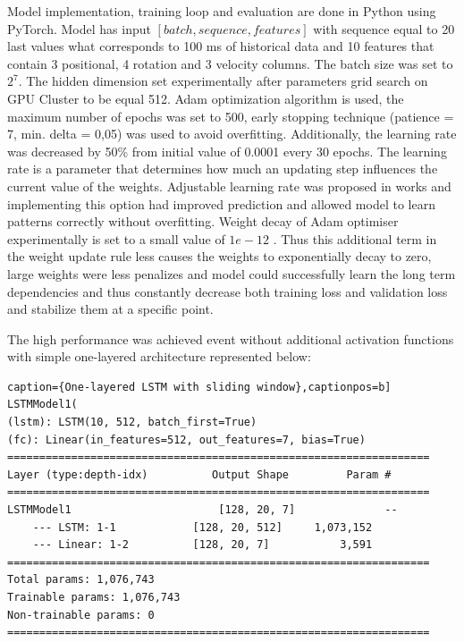 Model implementation, training loop and evaluation are done in Python using PyTorch. Model has input $[batch, sequence, features]$ with sequence equal to 20 last values what corresponds to 100 ms of historical data and 10 features that contain 3 positional, 4 rotation and 3 velocity columns. The batch size was set to $2^{7}$. The hidden dimension set experimentally after parameters grid search on GPU Cluster to be equal 512. Adam optimization algorithm is used, the maximum number of epochs was set to 500, early stopping technique (patience = 7, min. delta = 0,05) was used to avoid overfitting. Additionally, the learning rate was decreased by 50\% from initial value of 0.0001 every 30 epochs. The learning rate is a parameter that determines how much an updating step influences the current value of the weights. Adjustable learning rate was proposed in works \cite{delay_compensation_360, telepresence} and implementing this option had improved prediction and allowed model to learn patterns correctly without overfitting. Weight decay of Adam optimiser experimentally is set to a small value of $1e-12$ . Thus this additional term in the weight update rule less causes the weights to exponentially decay to zero, large weights were less penalizes and model could successfully learn the long term dependencies and thus constantly decrease both training loss and validation loss  and stabilize them at a specific point. 

The high performance was achieved event without additional activation functions with simple one-layered architecture represented below:
\begin{lstlisting}caption={One-layered LSTM with sliding window},captionpos=b]
LSTMModel1(
(lstm): LSTM(10, 512, batch_first=True)
(fc): Linear(in_features=512, out_features=7, bias=True)
==================================================================
Layer (type:depth-idx)          Output Shape         Param #
==================================================================
LSTMModel1                       [128, 20, 7]              --
	--- LSTM: 1-1            [128, 20, 512]     1,073,152
	--- Linear: 1-2          [128, 20, 7]           3,591
==================================================================
Total params: 1,076,743
Trainable params: 1,076,743
Non-trainable params: 0
==================================================================
\end{lstlisting}

